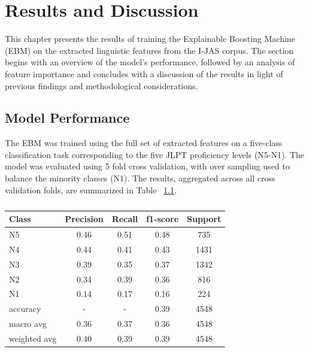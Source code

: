 \chapter{Results and Discussion}
This chapter presents the results of training the Explainable Boosting Machine (EBM) on the extracted linguistic
features from the I-JAS corpus. The section begins with an overview of the model's performance, followed by an
analysis of feature importance and concludes with a discussion of the results in light of previous findings and
methodological considerations.


\section{Model Performance}

The EBM was trained using the full set of extracted features on a five-class classification task corresponding to
the five JLPT proficiency levels (N5-N1). The model was evaluated using 5 fold cross validation, with over sampling
used to balance the minority classes (N1). The results, aggregated across all cross validation folds, are summarized
in Table~
\ref{tab:trainingResults}.

\begin{table}[h!]
    \centering
    \begin{tabular}{lcccc}
        \hline \textbf{Class} & \textbf{Precision} & \textbf{Recall} & \textbf{f1-score} & \textbf{Support} \\ \hline
        N5    &   0.46   &   0.51   &   0.48   &    735\\
          N4    &   0.44   &   0.41   &   0.43   &   1431\\
          N3    &   0.39   &   0.35   &   0.37  &    1342\\
          N2  &     0.34   &   0.39  &    0.36   &    816\\
          N1    &   0.14   &   0.17   &   0.16    &   224\\ \hline
        accuracy &   -    &      -    &     0.39  &    4548\\
   macro avg  &     0.36   &   0.37  &    0.36   &   4548\\
weighted avg  &     0.40  &    0.39    &  0.39   &   4548\\ \hline
    \end{tabular}
    \caption[Overall Classification Report (All Folds Combined)]{}
    \label{tab:trainingResults}
\end{table}

